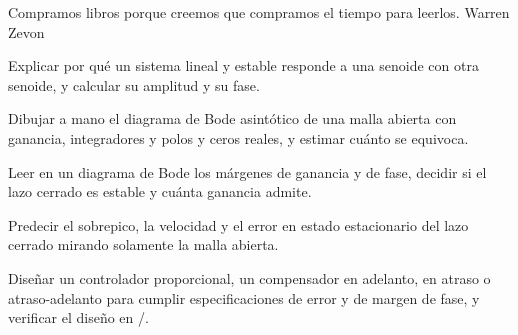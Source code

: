 
  {Compramos libros porque creemos que compramos el tiempo para leerlos.}
  {Warren Zevon}

\begin{objetivos}
  \item Explicar por qué un sistema lineal y estable responde a una senoide con otra senoide, y calcular su amplitud y su fase.
  \item Dibujar a mano el diagrama de Bode asintótico de una malla abierta con ganancia, integradores y polos y ceros reales, y estimar cuánto se equivoca.
  \item Leer en un diagrama de Bode los márgenes de ganancia y de fase, decidir si el lazo cerrado es estable y cuánta ganancia admite.
  \item Predecir el sobrepico, la velocidad y el error en estado estacionario del lazo cerrado mirando solamente la malla abierta.
  \item Diseñar un controlador proporcional, un compensador en adelanto, en atraso o atraso-adelanto para cumplir especificaciones de error y de margen de fase, y verificar el diseño en \matlab/\simulink.
\end{objetivos}














